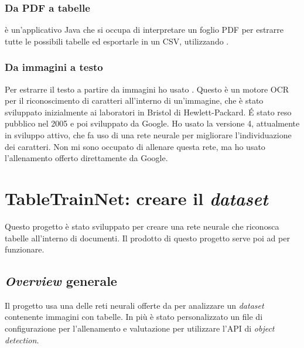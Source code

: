         \subsubsection*{Da PDF a tabelle}
        \cite{prod:tabula} è un'applicativo Java che si occupa di interpretare un foglio PDF per estrarre tutte le possibili tabelle ed esportarle in un CSV, utilizzando \cite{prod:pandas}.
        \subsubsection*{Da immagini a testo}
        Per estrarre il testo a partire da immagini ho usato \cite{prod:tesseract}. Questo è un motore OCR per il riconoscimento di caratteri all'interno di un'immagine, che è stato sviluppato inizialmente ai laboratori in Bristol di Hewlett-Packard. \'E stato reso pubblico nel 2005 e poi sviluppato da Google. Ho usato la versione 4, attualmente in sviluppo attivo, che fa uso di una rete neurale  per migliorare l'individuazione dei caratteri. Non mi sono occupato di allenare questa rete, ma ho usato l'allenamento offerto direttamente da Google.
\newpage
\section{TableTrainNet: creare il \textit{dataset}}
Questo progetto è stato sviluppato per creare una rete neurale che riconosca tabelle all'interno di documenti. Il prodotto di questo progetto serve poi ad  per funzionare.
    \subsection{\textit{Overview} generale}
    Il progetto usa una delle reti neurali offerte\cite{prod:tensorflow-model-zoo} da  per analizzare un \textit{dataset} contenente immagini con tabelle. In più è stato personalizzato un file di configurazione per l'allenamento e valutazione per utilizzare l'API di \textit{object detection}\cite{prod:tensorflow_o_d_api}.
